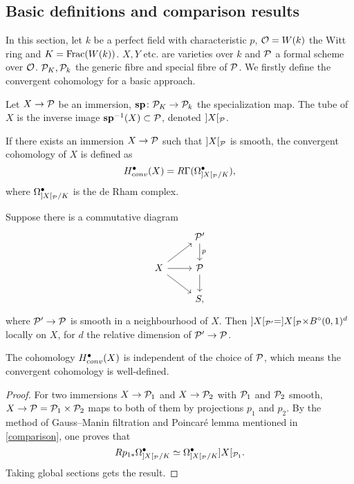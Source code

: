 \subsection{Basic definitions and comparison results}
In this section, let $k$ be a perfect field with characteristic $p$, 
${\mathcal {O}} = W(k)$ the Witt ring and $K = \operatorname{Frac}(W(k))$. 
$X, Y$ etc. are varieties over $k$ and 
${\mathcal {P}}$ a formal scheme over ${\mathcal {O}}$. 
${\mathcal {P}}_K, {\mathcal {P}}_k$ the generic fibre and special fibre of ${\mathcal {P}}$.
We firstly define the convergent cohomology for a basic approach.
\begin{definition}
    Let $X \to {\mathcal {P}}$ be an immersion, 
    $\mathbf{sp} \colon {\mathcal {P}}_K \to {\mathcal {P}}_k$ the specialization map. 
    The tube of $X$ is the inverse image $\mathbf{sp}^{-1}(X) \subset {\mathcal {P}}$, denoted $]X[_{\mathcal {P}}$.
\end{definition}

\begin{definition}
    If there exists an immersion $X \to {\mathcal {P}}$ such that 
    $]X[_{\mathcal {P}}$ is smooth, the convergent cohomology of $X$ is defined as
    \[
        H^\bullet_{conv}(X) = R\Gamma(\Omega_{]X[_{\mathcal {P}}/K}^\bullet),
    \]
    where $\Omega_{]X[_{\mathcal {P}}/K}^\bullet$ is the de Rham complex.
\end{definition}

\begin{proposition}
    Suppose there is a commutative diagram 
    \[
        \begin{tikzcd}
            & \CP'\ar[d, "p"]\\
            X \ar[r] \ar[ur] \ar[dr] & \CP \ar[d] \\
            & S,
        \end{tikzcd}
    \]
    where ${\mathcal {P}}' \to {\mathcal {P}}$ is smooth in a neighbourhood of $X$. 
    Then $]X[_{{\mathcal {P}}'} = ]X[_{{\mathcal {P}}} \times B^\circ(0,1)^d$ locally on $X$, 
    for $d$ the relative dimension of ${\mathcal {P}}' \to {\mathcal {P}}$.
\end{proposition}

\begin{proposition}
    The cohomology $H^\bullet_{conv}(X)$ is independent of the choice of ${\mathcal {P}}$, 
    which means the convergent cohomology is well-defined. 
\end{proposition}

\begin{proof}
    For two immersions $X \to {\mathcal {P}}_1$ and $X\to {\mathcal {P}}_2$ with ${\mathcal {P}}_1$ and ${\mathcal {P}}_2$ smooth, 
    $X \to {\mathcal {P}} = {\mathcal {P}}_1 \times {\mathcal {P}}_2$ maps to both of them by projections $p_1$ and $p_2$. 
    By the method of Gauss--Manin filtration and 
    Poincar\'e lemma mentioned in \ref{comparison}, 
    one proves that
    \[
        Rp_{1*} \Omega_{]X[_{\mathcal {P}}/K}^\bullet \simeq \Omega_{]X[_{\mathcal {P}}/K}^\bullet ]X[_{{\mathcal {P}}_1}.
    \] 
    Taking global sections gets the result.
\end{proof}

